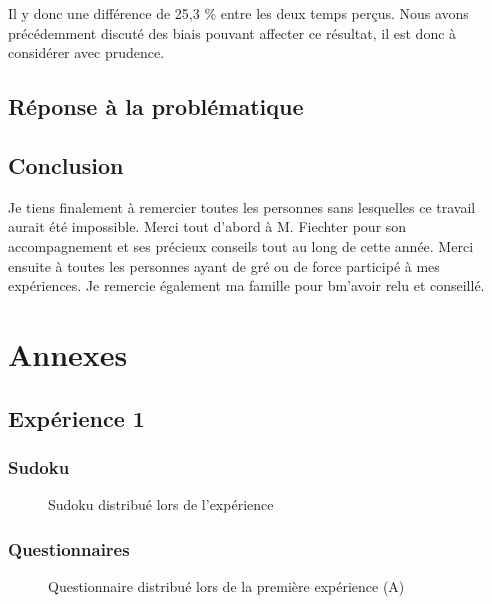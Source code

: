\documentclass[12pt,fleqn,oneside]{book} %
\begin{document}
Il y donc une différence de 25,3 \% entre les deux temps perçus. Nous avons précédemment discuté des biais pouvant affecter ce résultat, il est donc à considérer avec prudence. 

\newpage
\section{Réponse à la problématique}

\newpage
\section{Conclusion}

Je tiens finalement à remercier toutes les personnes sans lesquelles ce travail aurait été impossible. Merci tout d'abord à M. Fiechter pour son accompagnement et ses précieux conseils tout au long de cette année. Merci ensuite à toutes les personnes ayant de gré ou de force participé à mes expériences. Je remercie également ma famille pour bm'avoir relu et conseillé.


\appendix

\chapter{Annexes}
\section*{Expérience 1}

\subsection*{Sudoku} \label{sec:Sudoku}
\begin{figure}[htp] 
	\caption{Sudoku distribué lors de l'expérience}
\end{figure}  

\newpage
\subsection*{Questionnaires} \label{sec:Questionnaires}
\begin{figure}[htp] 
	\caption{Questionnaire distribué lors de la première expérience (A)}
\end{figure}
\end{document}
